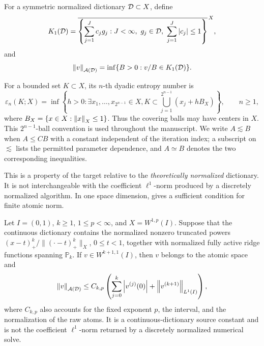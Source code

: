 \begin{definition}
\label{def:atomic}
For a symmetric normalized dictionary \(\mathcal{D}\subset X\), define
\[
 K_1(\D)=\overline{\left\{\sum_{j=1}^Jc_jg_j:
 J<\infty,\ g_j\in\D,\ \sum_{j=1}^J\abs{c_j}\leq1\right\}}^{\,X},
\]
and
\[
 \left\lVert v\right\rVert_{\mathcal A(\mathcal{D})}=
 \inf\{B>0:v/B\in K_1(\mathcal{D})\}.
\]
\end{definition}

For a bounded set \(K\subset X\), its \(n\)-th dyadic entropy number is
\[
 \varepsilon_n(K;X)=\inf\left\{h>0:\exists x_1,\ldots,x_{2^{n-1}}\in X,
 K\subset\bigcup_{j=1}^{2^{n-1}}(x_j+hB_X)\right\},\qquad n\geq1,
\]
where $B_X=\{x\in X:\left\lVert x\right\rVert_X\leq1\}$. Thus the covering balls may have centers in $X$.
This $2^{n-1}$-ball convention is used throughout the manuscript. We write
$A\lesssim B$ when $A\leq CB$ with a constant independent of the iteration index; a
subscript on $\lesssim$ lists the permitted parameter dependence, and $A\simeq B$ denotes the two
corresponding inequalities.


This is a property of the target relative to the \emph{theoretically normalized} dictionary. It is not
interchangeable with the coefficient \(\ell^1\)-norm produced by a discretely normalized algorithm. In one
space dimension,  gives a sufficient condition for finite atomic norm.

\begin{proposition}
\label{prop:1dsource}
Let \(I=(0,1)\), \(k\geq1\), \(1\leq p<\infty\), and \(X=W^{1,p}(I)\). Suppose that the continuous
dictionary contains the normalized nonzero truncated powers \((x-t)_+^k/\|(\cdot-t)_+^k\|_X\),
\(0\leq t<1\), together with normalized fully active ridge functions spanning \(\mathbb P_k\). If
\(v\in W^{k+1,1}(I)\), then \(v\) belongs to the atomic space and
\[
\left\lVert v\right\rVert_{\mathcal A(\mathcal{D})}\leq C_{k,p}\left(
 \sum_{j=0}^k\left\lvert v^{(j)}(0)\right\rvert+\left\lVert v^{(k+1)}\right\rVert_{L^1(I)}\right),
\]
where \(C_{k,p}\) also accounts for the fixed exponent \(p\), the interval, and the normalization
of the raw atoms. It is a continuous-dictionary source constant and is not the coefficient
\(\ell^1\)-norm returned by a discretely normalized numerical solve.
\end{proposition}

